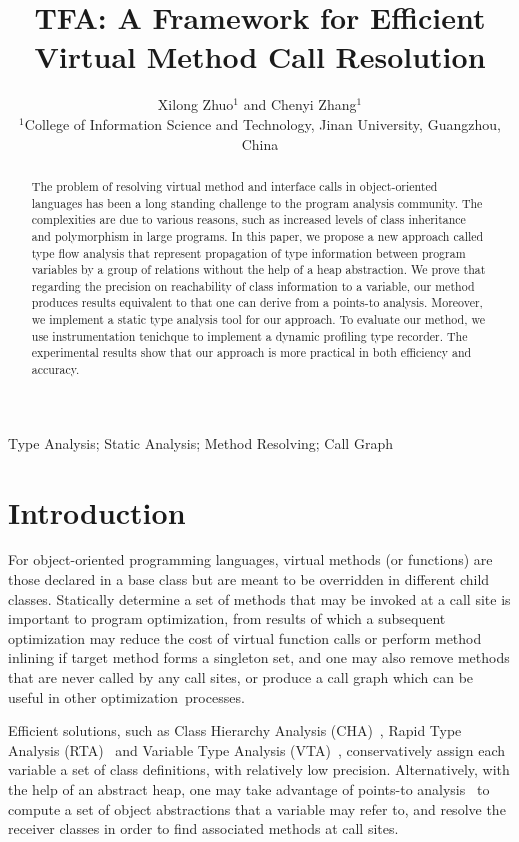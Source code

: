 \documentclass{fac}
\title{TFA: A Framework for Efficient %
		Virtual Method Call Resolution}
\author[Xilong Zhuo and Chenyi Zhang]
    {Xilong Zhuo$^1$ and Chenyi Zhang$^1$\\
     $^1$College of Information Science and Technology, Jinan University, Guangzhou, China}%
\begin{document}
\label{firstpage}

\makecorrespond

\maketitle

\begin{abstract}
The problem of resolving virtual method and interface calls in object-oriented languages has been a long standing challenge to the program analysis community. The complexities are due to various reasons, such as increased levels of class inheritance and polymorphism in large programs. In this paper, we propose a new approach called type flow analysis that represent propagation of type information between program variables by a group of relations without the help of a heap abstraction. We prove that regarding the precision on reachability of class information to a variable, our method produces results equivalent to that one can derive from a points-to analysis.
Moreover, we implement a static type analysis tool for our approach. To evaluate our method, we use instrumentation tenichque to implement a dynamic profiling type recorder. The experimental results show that our approach is more practical in both efficiency and accuracy.
\end{abstract}

\begin{keywords}
Type Analysis; Static Analysis; Method Resolving; Call Graph
\end{keywords}

\section{Introduction}\label{sec:introduction}
For object-oriented programming languages, virtual methods (or functions) are those declared in a base class but are meant to be overridden in different child classes. Statically determine a set of methods that may be invoked at a call site is important to program optimization, from results of which a subsequent optimization may reduce the cost of virtual function calls or perform method inlining if target method forms a singleton set, and one may also remove methods that are never called by any call sites, or produce a call graph which can be useful in other optimization~processes.

Efficient solutions, such as Class Hierarchy Analysis (CHA)~\cite{Dean1995,Fernandez1995}, Rapid Type Analysis (RTA)~\cite{Bacon1996} and Variable Type Analysis (VTA)~\cite{Sundaresan2000}, conservatively assign each variable a set of class definitions, with relatively low precision. Alternatively, with the help of an abstract heap, one may take advantage of points-to analysis~\cite{andersen94} to compute a set of object abstractions that a variable may refer to, and resolve the receiver classes in order to find associated methods at call sites.
\end{document}
